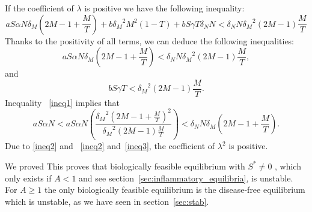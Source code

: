 \documentclass[a4paper, 12pt]{article}
\providecommand{\DIFaddtex}[1]{{\protect\color{blue} \sf #1}} %
\providecommand{\DIFdeltex}[1]{{\protect\color{red} \scriptsize #1}} %
\providecommand{\DIFaddbegin}{} %
\providecommand{\DIFaddend}{} %
\providecommand{\DIFdelbegin}{} %
\providecommand{\DIFdelend}{} %
\providecommand{\DIFadd}[1]{\texorpdfstring{\DIFaddtex{#1}}{#1}} %
\providecommand{\DIFdel}[1]{\texorpdfstring{\DIFdeltex{#1}}{}} %
\begin{document}
\noindent
If the coefficient of $\lambda$ is positive we have the following inequality:
\[
 a S \alpha N \delta_M (2M-1+\frac{M}{T})+ b{\delta_M}^2 M^2(1-T)+ b S\gamma T\delta_N N < \delta_N N {\delta_M}^2(2M-1)\frac{M}{T}
\]
Thanks to the positivity of all terms, we can deduce the following inequalities:
\begin{equation}
 a S \alpha N \delta_M (2M-1+\frac{M}{T}) < \delta_N N {\delta_M}^2(2M-1)\frac{M}{T},
\label{ineq1}
\end{equation}
and
\begin{equation}
 b S\gamma T < {\delta_M}^2(2M-1)\frac{M}{T}.
\label{ineq2}
\end{equation}
Inequality\DIFaddbegin \DIFadd{~}\DIFaddend \eqref{ineq1} implies that 
\begin{equation}\label{ineq3}
a S \alpha N < a S \alpha N\left(\frac{{\delta_M}^2 {(2M-1+\frac{M}{T}) }^2}{{\delta_M}^2(2M-1)\frac{M}{T}}\right)<\delta_N N \delta_M (2M-1+\frac{M}{T}).
\end{equation}
Due to\DIFdelbegin \DIFdel{\eqref{ineq2} and }\DIFdelend \DIFaddbegin \DIFadd{~\eqref{ineq2} and~}\DIFaddend \eqref{ineq3}, the coefficient of $\lambda^2$ is positive.
\par\noindent
\DIFdelbegin \DIFdel{We proved }\DIFdelend \DIFaddbegin \DIFadd{This proves }\DIFaddend that biologically feasible equilibrium with $S^* \neq 0$\DIFaddbegin \DIFadd{, which }\DIFaddend only exists if $A<1$ \DIFdelbegin \DIFdel{and }\DIFdelend \DIFaddbegin \DIFadd{see section~\ref{sec:inflammatory_equilibria},  }\DIFaddend is unstable.
For $A\geq 1$ the only biologically feasible equilibrium is the disease-free equilibrium which is unstable, as we have seen \DIFaddbegin \DIFadd{in section~\ref{sec:stab}}\DIFaddend .
\end{document}
